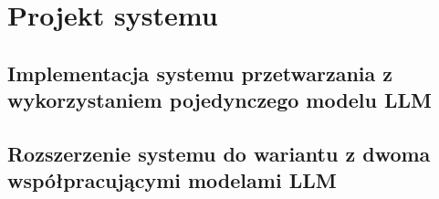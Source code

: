 \chapter{Projekt systemu}

\section{Implementacja systemu przetwarzania z wykorzystaniem pojedynczego modelu LLM}

\section{Rozszerzenie systemu do wariantu z dwoma współpracującymi modelami LLM}